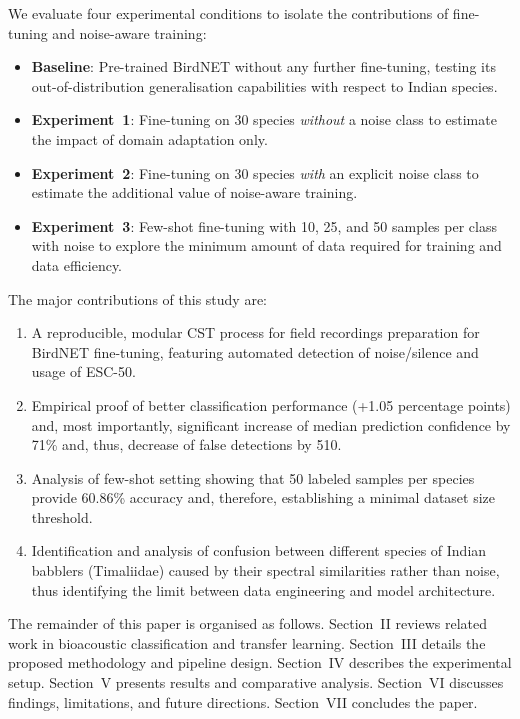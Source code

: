 \documentclass[conference]{IEEEtran}
\begin{document}
We evaluate four experimental conditions to isolate the contributions of fine-tuning and noise-aware training:

\begin{itemize}
    \item \textbf{Baseline}: Pre-trained BirdNET without any further fine-tuning, testing its out-of-distribution generalisation capabilities with respect to Indian species.
    \item \textbf{Experiment~1}: Fine-tuning on 30 species \textit{without} a noise class to estimate the impact of domain adaptation only.
    \item \textbf{Experiment~2}: Fine-tuning on 30 species \textit{with} an explicit noise class to estimate the additional value of noise-aware training.
    \item \textbf{Experiment~3}: Few-shot fine-tuning with 10, 25, and 50 samples per class with noise to explore the minimum amount of data required for training and data efficiency.
\end{itemize}

The major contributions of this study are:

\begin{enumerate}
    \item A reproducible, modular CST process for field recordings preparation for BirdNET fine-tuning, featuring automated detection of noise/silence and usage of ESC-50.
    \item Empirical proof of better classification performance (+1.05 percentage points) and, most importantly, significant increase of median prediction confidence by 71\% and, thus, decrease of false detections by 510.
    \item Analysis of few-shot setting showing that 50 labeled samples per species provide 60.86\% accuracy and, therefore, establishing a minimal dataset size threshold.
    \item Identification and analysis of confusion between different species of Indian babblers (Timaliidae) caused by their spectral similarities rather than noise, thus identifying the limit between data engineering and model architecture.
\end{enumerate}

The remainder of this paper is organised as follows. Section~II reviews related work in bioacoustic classification and transfer learning. Section~III details the proposed methodology and pipeline design. Section~IV describes the experimental setup. Section~V presents results and comparative analysis. Section~VI discusses findings, limitations, and future directions. Section~VII concludes the paper.
\end{document}
